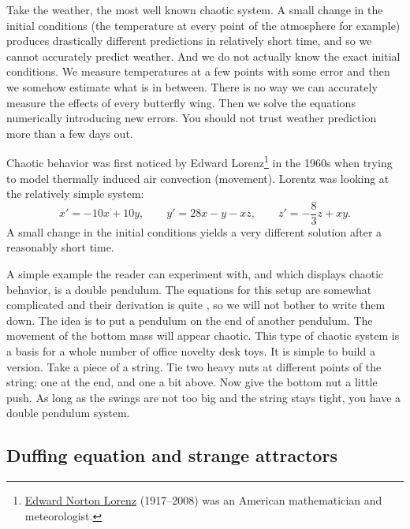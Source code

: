 Take the weather, the most well known chaotic system.
A small change in the initial conditions
(the temperature at every point of the atmosphere for example) produces
drastically different predictions in relatively short time, and so we cannot
accurately predict weather.  And we do not actually know the
exact initial conditions.  We measure temperatures at a few points with some
error and then we somehow estimate what is in between.
There is no way we
can accurately measure the effects of every butterfly wing.
Then
we solve the equations numerically introducing new errors.  You
should not trust weather prediction more than a few days out.

Chaotic behavior was first noticed by Edward
Lorenz\footnote{\href{https://en.wikipedia.org/wiki/Edward_Norton_Lorenz}{Edward Norton Lorenz} (1917--2008) was
an American mathematician and meteorologist.}
in the
1960s when trying to model thermally induced air convection (movement).
Lorentz was looking at the relatively simple system:
\begin{equation*}
x' = -10x +10y, \qquad y' = 28x-y-xz, \qquad z'=-\frac{8}{3}z + xy .
\end{equation*}
A small change in the initial conditions yields a very different solution
after a reasonably short time.

\begin{mywrapfigsimp}{0.95in}{1.25in}
\noindent
{}
\end{mywrapfigsimp}
A simple example the reader can experiment with, and which displays
chaotic behavior, is a double pendulum.  The equations for this
setup are somewhat complicated and their derivation is quite
, so we
will not bother to write them down.  The idea is to put a pendulum on the
end of another pendulum.  The movement of the bottom mass
will appear chaotic.  This type of chaotic system is a basis for a
whole number of office novelty desk toys.  It is simple to build a
version.  Take a piece of a string.  Tie two heavy nuts at different
points of the string; one at the end, and one a bit above.  Now give the
bottom nut a little push.  As long as the swings are not too big and the
string stays tight, you have a double pendulum system.

\subsection{Duffing equation and strange attractors}

